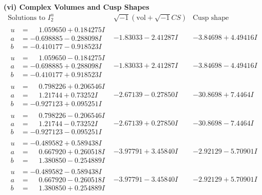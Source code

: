 \documentclass[1p]{elsarticle_modified}
\theoremstyle{definition}
\newcommand{\I}{\sqrt{-1}}
\begin{document}
\newpage\flushleft \textbf{(vi) Complex Volumes and Cusp Shapes}
$$\begin{array}{c|c|c}  
\text{Solutions to }I^u_{2}& \I (\text{vol} + \sqrt{-1}CS) & \text{Cusp shape}\\
 \hline 
\begin{aligned}
u &= \phantom{-}1.059650 + 0.184275 I \\
a &= -0.698885 - 0.288098 I \\
b &= -0.410177 - 0.918523 I\end{aligned}
 & -1.83033 - 2.41287 I & -3.84698 + 4.49416 I \\ \hline\begin{aligned}
u &= \phantom{-}1.059650 - 0.184275 I \\
a &= -0.698885 + 0.288098 I \\
b &= -0.410177 + 0.918523 I\end{aligned}
 & -1.83033 + 2.41287 I & -3.84698 - 4.49416 I \\ \hline\begin{aligned}
u &= \phantom{-}0.798226 + 0.206546 I \\
a &= \phantom{-}1.21744 + 0.73252 I \\
b &= -0.927123 + 0.095251 I\end{aligned}
 & -2.67139 - 0.27850 I & -30.8698 + 7.4464 I \\ \hline\begin{aligned}
u &= \phantom{-}0.798226 - 0.206546 I \\
a &= \phantom{-}1.21744 - 0.73252 I \\
b &= -0.927123 - 0.095251 I\end{aligned}
 & -2.67139 + 0.27850 I & -30.8698 - 7.4464 I \\ \hline\begin{aligned}
u &= -0.489582 + 0.589438 I \\
a &= \phantom{-}0.667920 + 0.260518 I \\
b &= \phantom{-}1.380850 - 0.254889 I\end{aligned}
 & -3.97791 + 3.45840 I & -2.92129 - 5.70901 I \\ \hline\begin{aligned}
u &= -0.489582 - 0.589438 I \\
a &= \phantom{-}0.667920 - 0.260518 I \\
b &= \phantom{-}1.380850 + 0.254889 I\end{aligned}
 & -3.97791 - 3.45840 I & -2.92129 + 5.70901 I \\ \hline\begin{aligned}

\end{aligned}
\end{array}$$
\end{document}
